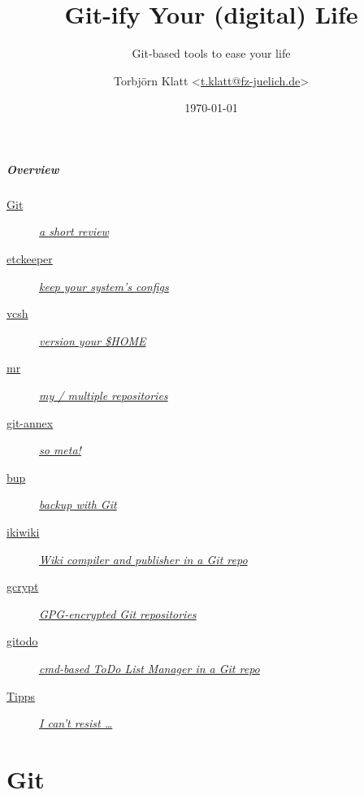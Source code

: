 \documentclass[english,hyperref={pdfpagelabels=false},aspectratio=169]{beamer}
\title{Git-ify Your (digital) Life}
\subtitle{Git-based tools to ease your life}
\author{Torbjörn Klatt <\href{mailto:t.klatt@fz-juelich.de}{t.klatt@fz-juelich.de}>}
\institute{JSC Internal Seminar}
\date{\today}
\begin{document}
\maketitle

\begin{frame}
  \frametitle{Overview}
  \begin{description}
    \item[\hyperlink{git}{Git}] \hyperlink{git}{\textit{a short review}}
    \item[\hyperlink{etckeeper}{etckeeper}] \hyperlink{etckeeper}{\textit{keep your system's configs}}
    \item[\hyperlink{vcsh}{vcsh}] \hyperlink{vcsh}{\textit{version your \$HOME}}
    \item[\hyperlink{mr}{mr}] \hyperlink{mr}{\textit{my / multiple repositories}}
    \item[\hyperlink{gitannex}{git-annex}] \hyperlink{gitannex}{\textit{so meta!}}
    \item[\hyperlink{bup}{bup}] \hyperlink{bup}{\textit{backup with Git}}
    \item[\hyperlink{ikiwiki}{ikiwiki}] \hyperlink{ikiwiki}{\textit{Wiki compiler and publisher in a Git repo}}
    \item[\hyperlink{gcrypt}{gcrypt}] \hyperlink{gcrypt}{\textit{GPG-encrypted Git repositories}}
    \item[\hyperlink{gitodo}{gitodo}] \hyperlink{gitodo}{\textit{cmd-based ToDo List Manager in a Git repo}}
    \item[\hyperlink{tipps}{Tipps}] \hyperlink{tipps}{\textit{I can't resist \dots}}
  \end{description}
\end{frame}


\part{Git}
\makepart
\end{document}

